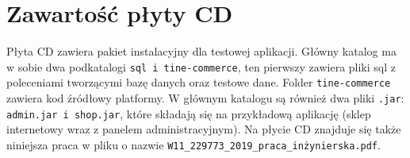 \chapter{Zawartość płyty CD}
\thispagestyle{chapterBeginStyle}
\label{plytaCD}

Płyta CD zawiera pakiet instalacyjny dla testowej aplikacji. Główny katalog ma w sobie dwa podkatalogi \texttt{sql i tine-commerce}, ten pierwszy zawiera pliki sql z poleceniami tworzącymi bazę danych oraz testowe dane. Folder \texttt{tine-commerce} zawiera kod źródłowy platformy. W głównym katalogu są również dwa pliki \texttt{.jar}: \texttt{admin.jar i shop.jar}, które składają się na przykładową aplikację (sklep internetowy wraz z panelem administracyjnym). Na płycie CD znajduje się także niniejsza praca w pliku o nazwie \texttt{W11\_229773\_2019\_praca\_inżynierska.pdf}.

